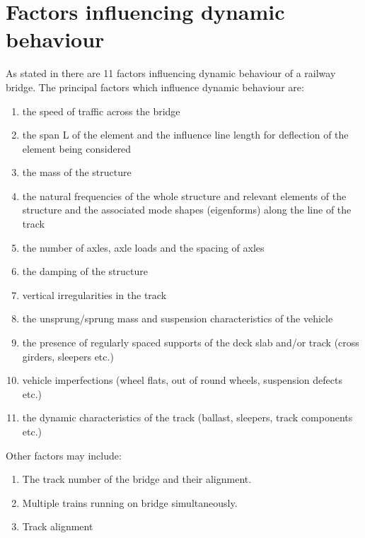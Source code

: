 
\section{Factors influencing dynamic behaviour}
As stated in\cite[6.4.2]{EC12} there are 11 factors influencing dynamic behaviour of a railway bridge. The principal factors which influence dynamic behaviour are:
\begin{enumerate}[-]
	\item the speed of traffic across the bridge
	\item the span L of the element and the influence line length for deflection of the element being considered
	\item the mass of the structure
	\item the natural frequencies of the whole structure and relevant elements of the structure and the associated mode shapes (eigenforms) along the line of the track
	\item the number of axles, axle loads and the spacing of axles
	\item the damping of the structure
	\item vertical irregularities in the track
	\item the unsprung/sprung mass and suspension characteristics of the vehicle
	\item the presence of regularly spaced supports of the deck slab and/or track (cross girders, sleepers etc.)
	\item vehicle imperfections (wheel flats, out of round wheels, suspension defects etc.)
	\item the dynamic characteristics of the track (ballast, sleepers, track components etc.)
\end{enumerate}

Other factors may include:

\begin{enumerate}

	\item The track number of the bridge and their alignment. 
	\item Multiple trains running on bridge simultaneously. 
	\item Track alignment

\end{enumerate}

